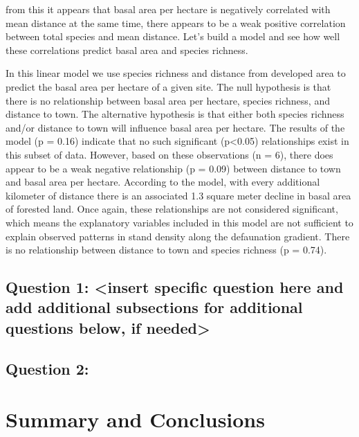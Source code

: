 \documentclass[
  12pt,
]{article}
\begin{document}
from this it appears that basal area per hectare is negatively
correlated with mean distance at the same time, there appears to be a
weak positive correlation between total species and mean distance. Let's
build a model and see how well these correlations predict basal area and
species richness.

In this linear model we use species richness and distance from developed
area to predict the basal area per hectare of a given site. The null
hypothesis is that there is no relationship between basal area per
hectare, species richness, and distance to town. The alternative
hypothesis is that either both species richness and/or distance to town
will influence basal area per hectare. The results of the model (p =
0.16) indicate that no such significant (p\textless0.05) relationships
exist in this subset of data. However, based on these observations (n =
6), there does appear to be a weak negative relationship (p = 0.09)
between distance to town and basal area per hectare. According to the
model, with every additional kilometer of distance there is an
associated 1.3 square meter decline in basal area of forested land. Once
again, these relationships are not considered significant, which means
the explanatory variables included in this model are not sufficient to
explain observed patterns in stand density along the defaunation
gradient. There is no relationship between distance to town and species
richness (p = 0.74).

\hypertarget{question-1-insert-specific-question-here-and-add-additional-subsections-for-additional-questions-below-if-needed}{%
\subsection{Question 1: \textless insert specific question here and add
additional subsections for additional questions below, if
needed\textgreater{}}\label{question-1-insert-specific-question-here-and-add-additional-subsections-for-additional-questions-below-if-needed}}

\hypertarget{question-2}{%
\subsection{Question 2:}\label{question-2}}

\newpage

\hypertarget{summary-and-conclusions}{%
\section{Summary and Conclusions}\label{summary-and-conclusions}}
\end{document}
